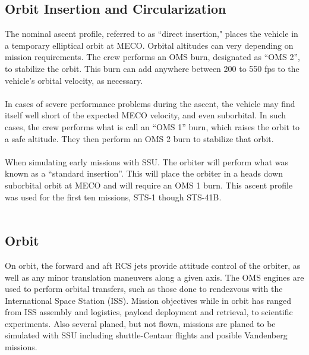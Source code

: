 \documentclass[13pt, letter,final]{article}
\begin{document}
\begin{multicols}{2}
\begin{center}
\subsection*{Orbit Insertion and Circularization}
\end{center}
The nominal ascent profile, referred to as ``direct insertion," places the vehicle in a temporary elliptical orbit at MECO. Orbital altitudes can very depending on mission requirements. The crew performs an OMS burn, designated as ``OMS 2'', to stabilize the orbit. This burn can add anywhere between 200 to 550 fps to the vehicle's orbital velocity, as necessary.\\
\\
In cases of severe performance problems during the ascent, the vehicle may find itself well short of the expected MECO velocity, and even suborbital. In such cases, the crew performs what is call an ``OMS 1'' burn, which raises the orbit to a safe altitude. They then perform an OMS 2 burn to stabilize that orbit.\\
\\
When simulating early missions with SSU. The orbiter will perform what was known as a ``standard insertion''. This will place the orbiter in a heads down suborbital orbit at MECO and will require an OMS 1 burn.  This ascent profile was used for the first ten missions, STS-1 though STS-41B.\\
\\
\begin{center}
\subsection*{Orbit}
\end{center}
On orbit, the forward and aft RCS jets provide attitude control of the orbiter, as well as any minor translation maneuvers along a given axis. The OMS engines are used to perform orbital transfers, such as those done to rendezvous with the International Space Station (ISS). Mission objectives while in orbit has ranged from ISS assembly and logistics, payload deployment and retrieval, to scientific experiments.  Also several planed, but not flown, missions are planed to be simulated with SSU including shuttle-Centaur flights and posible Vandenberg missions.
\\
\begin{center}

\end{center}
\end{multicols}
\end{document}
